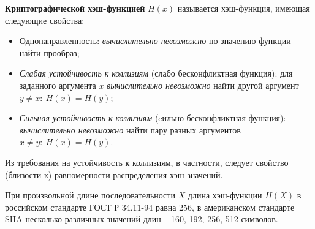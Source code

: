 \textbf{Криптографической хэш-функцией} $H(x)$ называется хэш-функция, имеющая следующие свойства:
\begin{itemize}
    \item Однонаправленность: \emph{вычислительно невозможно} по значению функции найти прообраз;
    \item \emph{Слабая устойчивость к коллизиям} (слабо бесконфликтная функция): для заданного аргумента $x$ \emph{вычислительно невозможно} найти другой аргумент $y \neq x: ~ H(x) = H(y)$;
    \item \emph{Сильная устойчивость к коллизиям} (cильно бесконфликтная функция): \emph{вычислительно невозможно} найти пару разных аргументов $x \neq y: ~ H(x) = H(y)$.
\end{itemize}

Из требования на устойчивость к коллизиям, в частности, следует свойство (близости к) равномерности распределения хэш-значений.

При произвольной длине последовательности $X$ длина хэш-функции $H(X)$  в российском стандарте ГОСТ Р 34.11-94 равна 256, в американском стандарте SHA несколько различных значений длин -- 160, 192, 256, 512 символов.
